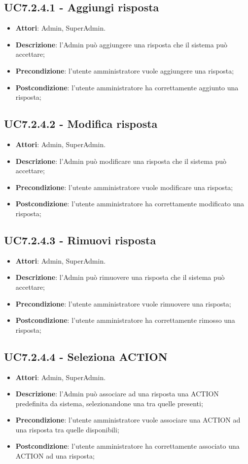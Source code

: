 \documentclass[../AnalisiDeiRequisiti.tex]{subfiles}
\begin{document}
\subsection{UC7.2.4.1 - Aggiungi risposta} 
\label{sssec:UC7.2.4.1} 
\begin{itemize} 
\item \textbf{Attori}: Admin, SuperAdmin.
\item \textbf{Descrizione}: l'Admin può aggiungere una risposta che il sistema può accettare;
\item \textbf{Precondizione}: l'utente amministratore vuole aggiungere una risposta;
\item \textbf{Postcondizione}: l'utente amministratore ha correttamente aggiunto una risposta;
\end{itemize} 
\subsection{UC7.2.4.2 - Modifica risposta} 
\label{sssec:UC7.2.4.2} 
\begin{itemize} 
\item \textbf{Attori}: Admin, SuperAdmin.
\item \textbf{Descrizione}: l'Admin può modificare una risposta che il sistema può accettare;
\item \textbf{Precondizione}: l'utente amministratore vuole modificare una risposta;
\item \textbf{Postcondizione}: l'utente amministratore ha correttamente modificato una risposta;
\end{itemize} 
\subsection{UC7.2.4.3 - Rimuovi risposta} 
\label{sssec:UC7.2.4.3} 
\begin{itemize} 
\item \textbf{Attori}: Admin, SuperAdmin.
\item \textbf{Descrizione}: l'Admin può rimuovere una risposta che il sistema può accettare;
\item \textbf{Precondizione}: l'utente amministratore vuole rimuovere una risposta;
\item \textbf{Postcondizione}: l'utente amministratore ha correttamente rimosso una risposta;
\end{itemize} 
\subsection{UC7.2.4.4 - Seleziona ACTION} 
\label{sssec:UC7.2.4.4} 
\begin{itemize} 
\item \textbf{Attori}: Admin, SuperAdmin.
\item \textbf{Descrizione}: l'Admin può associare ad una risposta una ACTION predefinita da sistema, selezionandone una tra quelle presenti;
\item \textbf{Precondizione}: l'utente amministratore vuole associare una ACTION ad una risposta tra quelle disponibili;
\item \textbf{Postcondizione}: l'utente amministratore ha correttamente associato una ACTION ad una risposta;
\end{itemize} 
\end{document}
